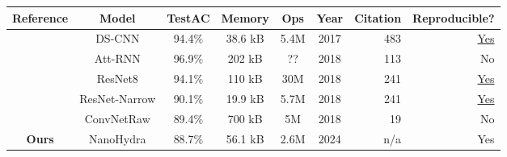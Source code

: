 \begin{table}
\begin{tabular}{||c|c|c|c|c|c|r|r||}
    \hline
    Reference & Model & TestAC & Memory & Ops & Year & Citation & Reproducible? \\

    \hline\hline
    \cite{Zhang2017}   &        DS-CNN & 94.4\% & 38.6 kB & 5.4M & 2017 & 483 &  \href{https://github.com/ARM-software/ML-KWS-for-MCU}{Yes} \\
    \cite{Andrade2018} &       Att-RNN & 96.9\% &  202 kB &   ?? & 2018 & 113 &  No \\
    \cite{Tang2018}    &       ResNet8 & 94.1\% &  110 kB &  30M & 2018 & 241 &  \href{https://github.com/castorini/honk/}{Yes} \\
    \cite{Tang2018}    & ResNet-Narrow & 90.1\% & 19.9 kB & 5.7M & 2018 & 241 &  \href{https://github.com/castorini/honk/}{Yes} \\
    \cite{Jansson2018} &    ConvNetRaw & 89.4\% &  700 kB &   5M & 2018 &  19 &  No \\
    \textbf{Ours}      &     NanoHydra & 88.7\% & 56.1 kB & 2.6M & 2024 & n/a &  Yes \\
    \hline
\end{tabular}
\end{table}

%
